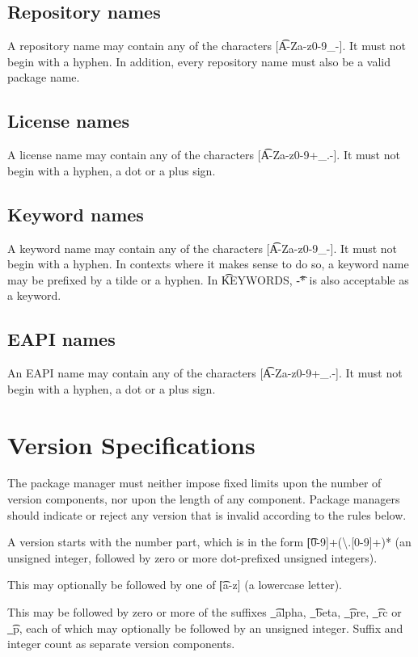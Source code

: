 \subsection{Repository names}
\label{sec:repository-names}
A repository name may contain any of the characters [\t{A-Za-z0-9_-}]. It must not begin with a
hyphen. In addition, every repository name must also be a valid package name.

\subsection{License names}
\label{sec:license-names}
A license name may contain any of the characters [\t{A-Za-z0-9+_.-}]. It must not begin with a
hyphen, a dot or a plus sign.

\subsection{Keyword names}
\label{sec:keyword-names}
A keyword name may contain any of the characters [\t{A-Za-z0-9_-}]. It must not begin with a
hyphen. In contexts where it makes sense to do so, a keyword name may be prefixed by
a tilde or a hyphen. In \t{KEYWORDS}, \t{-*} is also acceptable as a keyword.

\subsection{EAPI names}
\label{sec:eapi-names}
An EAPI name may contain any of the characters [\t{A-Za-z0-9+_.-}]. It must not begin with a
hyphen, a dot or a plus sign.

\section{Version Specifications}
\label{sec:version-spec}
The package manager must neither impose fixed limits upon the number of version components, nor
upon the length of any component. Package managers should indicate or reject any version that is
invalid according to the rules below.

A version starts with the number part, which is in the form \t{[0-9]+(\textbackslash.[0-9]+)*}
(an unsigned integer, followed by zero or more dot-prefixed unsigned integers).

This may optionally be followed by one of \t{[a-z]} (a lowercase letter).

This may be followed by zero or more of the suffixes \t{_alpha}, \t{_beta}, \t{_pre}, \t{_rc}
or \t{_p}, each of which may optionally be followed by an unsigned integer. Suffix and integer
count as separate version components.

